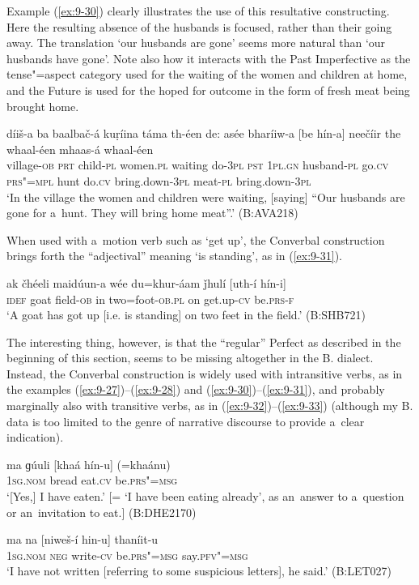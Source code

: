 Example (\ref{ex:9-30}) clearly illustrates the use of this resultative constructing. Here the resulting absence of the husbands is focused, rather than their going away. The translation `our husbands are gone' seems more natural than `our husbands have gone'. Note also how it interacts with the Past Imperfective as the tense"=aspect category used for the waiting of the women and children at home, and the Future is used for the hoped for outcome in the form of fresh meat being brought home.

\begin{exe}
\ex
\label{ex:9-30}
\gll díiš-a ba baalbač-á kuṛíina táma th-éen de: asée bharíiw-a [be hín-a] neečíir the whaal-éen mhaas-á whaal-éen \\
village-\textsc{ob} \textsc{prt} child-\textsc{pl} women.\textsc{pl} waiting  do-\textsc{3pl} \textsc{pst } \textsc{1pl.gn} husband-\textsc{pl} go.\textsc{cv} \textsc{prs"=mpl}  hunt do.\textsc{cv} bring.down-\textsc{3pl} meat-\textsc{pl} bring.down-\textsc{3pl} \\
\glt `In the village the women and children were waiting, [saying] ``Our husbands are gone for a~hunt. They will bring home meat''.' (B:AVA218)
\end{exe}

When used with a~motion verb such as `get up', the Converbal construction brings forth the ``adjectival'' meaning `is standing', as in (\ref{ex:9-31}).

\begin{exe}
\ex
\label{ex:9-31}
\gll ak čhéeli maidúun-a wée du=khur-áam ǰhulí [uth-í hín-i] \\
\textsc{idef} goat field-\textsc{ob} in two=foot-\textsc{ob.pl} on get.up-\textsc{cv} be.\textsc{prs-f} \\
\glt `A goat has got up [i.e. is standing] on two feet in the field.' (B:SHB721)
\end{exe}

The interesting thing, however, is that the ``regular'' Perfect as described in the beginning of this section, seems to be missing altogether in the B. dialect. Instead, the Converbal construction is widely used with intransitive verbs, as in the examples (\ref{ex:9-27})--(\ref{ex:9-28}) and (\ref{ex:9-30})--(\ref{ex:9-31}), and probably marginally also with transitive verbs, as in (\ref{ex:9-32})--(\ref{ex:9-33}) (although my B. data is too limited to the genre of narrative discourse to provide a~clear indication).

\begin{exe}
\ex
\label{ex:9-32}
\gll ma ɡúuli [khaá hín-u] (=khaánu)  \\
\textsc{1sg.nom} bread eat.\textsc{cv} be.\textsc{prs"=msg} \\
\glt `[Yes,] I have eaten.' [= `I have been eating already', as an~answer to a~question or an~invitation to eat.] (B:DHE2170)

\ex
\label{ex:9-33}
\gll ma na [niweš-í hin-u] thaníit-u  \\
\textsc{1sg.nom} \textsc{neg} write-\textsc{cv} be.\textsc{prs"=msg} say.\textsc{pfv"=msg} \\
\glt `I have not written [referring to some suspicious letters], he said.' (B:LET027)
\end{exe}

